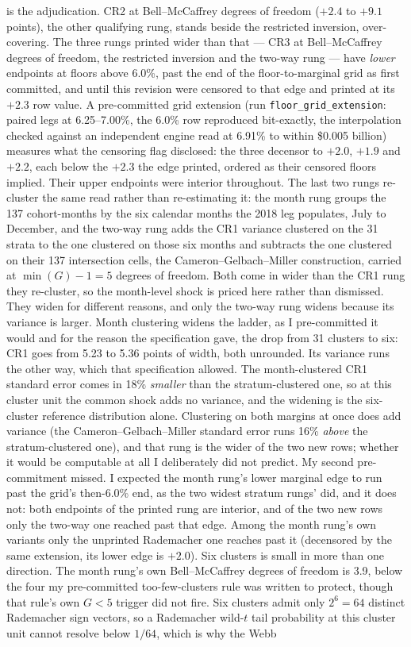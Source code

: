 \documentclass[12pt]{article}
\begin{document}
is the adjudication. CR2 at Bell--McCaffrey degrees of freedom ($+2.4$ to $+9.1$ points), the other qualifying rung, stands beside the restricted inversion, over-covering. The three rungs printed wider than that --- CR3 at Bell--McCaffrey degrees of freedom, the restricted inversion and the two-way rung --- have \emph{lower} endpoints at floors above 6.0\%, past the end of the floor-to-marginal grid as first committed, and until this revision were censored to that edge and printed at its $+2.3$ row value. A pre-committed grid extension (run \texttt{floor\_grid\_extension}: paired legs at 6.25--7.00\%, the 6.0\% row reproduced bit-exactly, the interpolation checked against an independent engine read at 6.91\% to within \$0.005 billion) measures what the censoring flag disclosed: the three decensor to $+2.0$, $+1.9$ and $+2.2$, each below the $+2.3$ the edge printed, ordered as their censored floors implied. Their upper endpoints were interior throughout. The last two rungs re-cluster the same read rather than re-estimating it: the month rung groups the 137 cohort-months by the six calendar months the 2018 leg populates, July to December, and the two-way rung adds the CR1 variance clustered on the 31 strata to the one clustered on those six months and subtracts the one clustered on their 137 intersection cells, the Cameron--Gelbach--Miller construction, carried at $\min(G)-1 = 5$ degrees of freedom. Both come in wider than the CR1 rung they re-cluster, so the month-level shock is priced here rather than dismissed. They widen for different reasons, and only the two-way rung widens because its variance is larger. Month clustering widens the ladder, as I pre-committed it would and for the reason the specification gave, the drop from 31 clusters to six: CR1 goes from 5.23 to 5.36 points of width, both unrounded. Its variance runs the other way, which that specification allowed. The month-clustered CR1 standard error comes in 18\% \emph{smaller} than the stratum-clustered one, so at this cluster unit the common shock adds no variance, and the widening is the six-cluster reference distribution alone. Clustering on both margins at once does add variance (the Cameron--Gelbach--Miller standard error runs 16\% \emph{above} the stratum-clustered one), and that rung is the wider of the two new rows; whether it would be computable at all I deliberately did not predict. My second pre-commitment missed. I expected the month rung's lower marginal edge to run past the grid's then-6.0\% end, as the two widest stratum rungs' did, and it does not: both endpoints of the printed rung are interior, and of the two new rows only the two-way one reached past that edge. Among the month rung's own variants only the unprinted Rademacher one reaches past it (decensored by the same extension, its lower edge is $+2.0$). Six clusters is small in more than one direction. The month rung's own Bell--McCaffrey degrees of freedom is 3.9, below the four my pre-committed too-few-clusters rule was written to protect, though that rule's own $G < 5$ trigger did not fire. Six clusters admit only $2^{6} = 64$ distinct Rademacher sign vectors, so a Rademacher wild-$t$ tail probability at this cluster unit cannot resolve below $1/64$, which is why the Webb 
\end{document}
